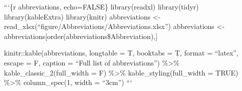 \documentclass[11pt,twoside]{bristolthesis}
\begin{document}
  \begin{abbreviations}
    ```\{r abbreviations, echo=FALSE\}
    library(readxl)
    library(tidyr)
    library(kableExtra)
    library(knitr)
    abbreviations \textless- read\_xlsx(``figure/Abbreviations/Abbreviations.xlsx'')
    abbreviations \textless- abbreviations{[}order(abbreviations\$Abbreviation),{]}

    kinitr::kable(abbreviations, longtable = T, booktabs = T, format = ``latex'', escape = F,
    caption = ``Full list of abbreviations'') \%\textgreater\%
    kable\_classic\_2(full\_width = F) \%\textgreater\%
    kable\_styling(full\_width = TRUE) \%\textgreater\%
    column\_spec(1, width = ``3cm'')
    ```
  \end{abbreviations}
\end{document}
